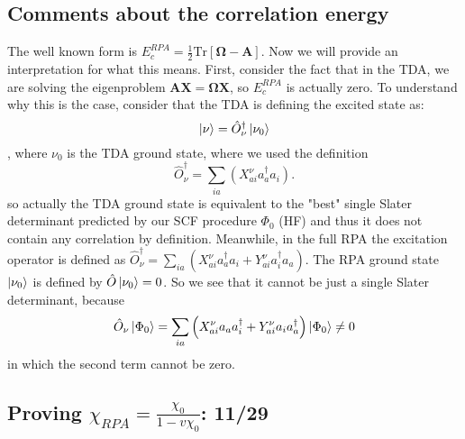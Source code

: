 \subsection{Comments about the correlation energy}
The well known form is $E_c^{RPA} = \frac{1}{2} \text{Tr} \left[ \bm{\Omega } - \bm{A}\right]$. Now we will provide an interpretation for what this means. First, consider the fact that in the TDA, we are solving the eigenproblem $\bm{A} \bm{X} = \bm{\Omega} \bm{X}$, so $E_c^{RPA}$ is actually zero. To understand why this is the case, consider that the TDA is defining the excited state as:
\begin{equation}
    \ket{\nu} = \hat{O}_\nu^\dagger \ket{\nu_0}
\end{equation}
, where $\nu_0$ is the TDA ground state, where we used the definition
\begin{equation}
    \hat{O}_\nu^\dagger = \sum_{ia} \left( X^\nu_{ai} a_a^\dagger a_i \right).
\end{equation}
so actually the TDA ground state is equivalent to the "best" single Slater determinant predicted by our SCF procedure $\Phi_0$ (HF) and thus it does not contain any correlation by definition. Meanwhile, in the full RPA the excitation operator is defined as $\hat{O}_\nu^\dagger = \sum_{ia} \left( X^\nu_{ai} a_a^\dagger a_i + Y^\nu_{ai} a_i^\dagger a_a \right)$. The RPA ground state $\ket{\nu_0}$ is defined by $\hat{O} \ket{\nu_0} = 0$. So we see that it cannot be just a single Slater determinant, because
\begin{equation}
    \hat{O}_\nu \ket{\Phi_0} = \sum_{ia} \left( X^\nu_{ai} a_a a_i^\dagger + Y^\nu_{ai} a_i a_a^\dagger \right) \ket{\Phi_0} \neq 0
\end{equation}
in which the second term cannot be zero.
\subsection{Proving $\chi_{RPA}=\frac{\chi_0}{1-v\chi_0}$: 11/29}
